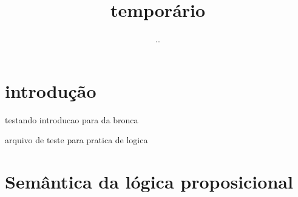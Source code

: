 \documentclass{article}
\title{temporário}
\author{..}
\begin{document}
\maketitle

\section{introdução}

testando introducao para da bronca

arquivo de teste para pratica de logica

\section{Semântica da lógica proposicional}
\end{document}

